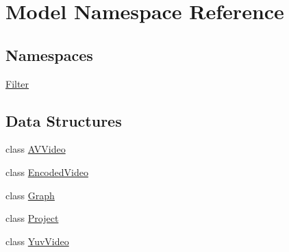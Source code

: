 \hypertarget{namespaceModel}{}\section{Model Namespace Reference}
\label{namespaceModel}
\subsection*{Namespaces}
\begin{DoxyCompactItemize}
\item 
 \hyperlink{namespaceModel_1_1Filter}{Filter}
\end{DoxyCompactItemize}
\subsection*{Data Structures}
\begin{DoxyCompactItemize}
\item 
class \hyperlink{classModel_1_1AVVideo}{A\+V\+Video}
\item 
class \hyperlink{classModel_1_1EncodedVideo}{Encoded\+Video}
\item 
class \hyperlink{classModel_1_1Graph}{Graph}
\item 
class \hyperlink{classModel_1_1Project}{Project}
\item 
class \hyperlink{classModel_1_1YuvVideo}{Yuv\+Video}
\end{DoxyCompactItemize}
